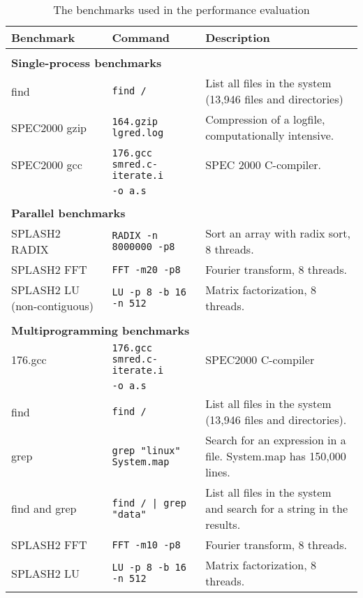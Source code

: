 \begin{table}
  \caption{The benchmarks used in the performance evaluation}
  \begin{center}
    \begin{small}
      \label{tab:benchmarks}
      \begin{tabular}{p{2.6cm}|l|p{4.2cm}}
        Benchmark & Command & Description \\
        \hline
        \multicolumn{3}{l}{} \\
        \multicolumn{3}{l}{\textbf{Single-process benchmarks}} \\
        \hline
        find & \texttt{find /} & List all files in the system (13,946 files and directories) \\
        \hline
        SPEC2000 gzip & \texttt{164.gzip lgred.log} & Compression of a logfile,
        computationally intensive. \\
        \hline
        SPEC2000 gcc & \texttt{176.gcc smred.c-iterate.i} & SPEC 2000 C-compiler. \\
        & \texttt{-o a.s} \\
        \hline
        \multicolumn{3}{l}{} \\
        \multicolumn{3}{l}{\textbf{Parallel benchmarks}} \\
        \hline
        SPLASH2 RADIX & \texttt{RADIX -n 8000000 -p8} & Sort an array with radix
        sort, 8 threads.\\
        \hline
        SPLASH2 FFT & \texttt{FFT -m20 -p8} & Fourier transform, 8 threads. \\
        \hline
        SPLASH2 LU (non-contiguous) & \texttt{LU -p 8 -b 16 -n 512} & Matrix
        factorization, 8 threads. \\
        \hline
        \multicolumn{3}{l}{} \\
        \multicolumn{3}{l}{\textbf{Multiprogramming benchmarks}} \\
        \hline
        176.gcc & \texttt{176.gcc smred.c-iterate.i} & SPEC2000 C-compiler \\
        & \texttt{-o a.s} \\
        \hline
        find & \texttt{find /} & List all files in the system (13,946 files and
        directories). \\
        \hline
        grep & \texttt{grep "linux" System.map} & Search for an expression
        in a file. System.map has 150,000 lines. \\
        \hline
        find and grep & \texttt{find / | grep "data"} & List all files in the
        system and search for a string in the results.\\
        \hline
        SPLASH2 FFT & \texttt{FFT -m10 -p8} & Fourier transform, 8 threads. \\
        \hline
        SPLASH2 LU & \texttt{LU -p 8 -b 16 -n 512} &
        Matrix factorization, 8 threads. \\
      \end{tabular}
    \end{small}
  \end{center}
\end{table}

